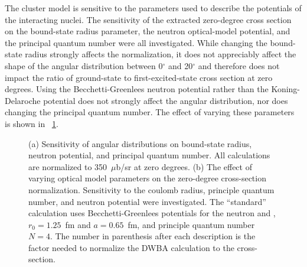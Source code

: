 The cluster model is sensitive to the parameters used to describe the potentials of the interacting nuclei.  The sensitivity of the extracted zero-degree cross section on the bound-state radius parameter, the neutron optical-model potential, and the principal quantum number were all investigated.  While changing the bound-state radius strongly affects the normalization, it does not appreciably affect the shape of the angular distribution between 0$^{\circ}$ and 20$^{\circ}$ and therefore does not impact the ratio of ground-state to first-excited-state cross section at zero degrees.  Using the Becchetti-Greenlees neutron potential rather than the Koning-Delaroche potential does not strongly affect the angular distribution, nor does changing the principal quantum number.  The effect of varying these parameters is shown in {\fig}~\ref{fig:varyParam}.
\begin{figure}[!htbp]
\centering
{}
\caption{(a) Sensitivity of angular distributions on bound-state radius, neutron potential, and principal quantum number.  All calculations are normalized to 350~$\mu$b/sr at zero degrees. (b) The effect of varying optical model parameters on the zero-degree cross-section normalization.  Sensitivity to the coulomb radius, principle quantum number, and neutron potential were investigated.  The ``standard'' calculation uses Becchetti-Greenlees potentials for the neutron and , $r_0=1.25$~fm and $a=0.65$~fm, and principle quantum number $N=4$.  The number in parenthesis after each description is the factor needed to normalize the DWBA calculation to the  cross-section.}
\label{fig:varyParam}
\end{figure}
